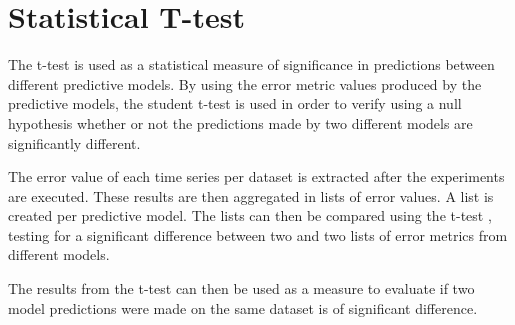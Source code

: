 
\section{Statistical T-test}
\label{section:Method:Statistical-t-test}


The t-test is used as a statistical measure of significance in predictions between different predictive models.
By using the error metric values produced by the predictive models,
the student t-test is used in order to verify using a null hypothesis
whether or not the predictions made by two different models are significantly different.

The error value of each time series per dataset is extracted after the experiments are executed.
These results are then aggregated in lists of error values.
A list is created per predictive model.
The lists can then be compared using the t-test ,
testing for a significant difference between two and two lists of error metrics from different models.

The results from the t-test can then be used as a measure to evaluate if two model predictions were made on the same dataset
is of significant difference.

